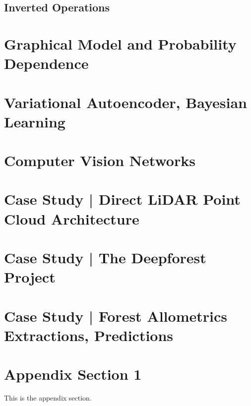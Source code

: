 \documentclass[]{article}
\theoremstyle{definition}
\numberwithin{equation}{subsection}
\begin{document}
    \subsection{Inverted Operations}
        
    
\section{Graphical Model and Probability Dependence}
    
\section{Variational Autoencoder, Bayesian Learning}

\section{Computer Vision Networks}
    
\section{Case Study | Direct LiDAR Point Cloud Architecture}
    
\section{Case Study | The Deepforest Project}

\section{Case Study | Forest Allometrics Extractions, Predictions}




\appendix
\section{Appendix Section 1}
    This is the appendix section. 





% 
\end{document}
